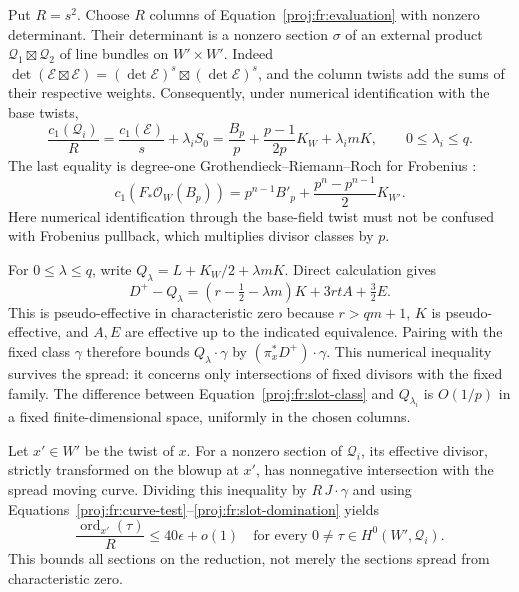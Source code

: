 \documentclass[11pt,letterpaper]{article}
\theoremstyle{definition}
\theoremstyle{remark}
\begin{document}
Put \(R=s^2\). Choose \(R\) columns of
Equation~\eqref{proj:fr:evaluation} with nonzero determinant. Their
determinant is a nonzero section \(\sigma\) of an external product
\(\mathcal Q_1\boxtimes\mathcal Q_2\) of line bundles on \(W'\times W'\).
Indeed
\(\det(\mathcal E\boxtimes\mathcal E)
 =(\det\mathcal E)^s\boxtimes(\det\mathcal E)^s\),
and the column twists add the sums of their respective weights.
Consequently, under numerical identification with the base twists,
\begin{equation}
\label{proj:fr:slot-class}
 \frac{c_1(\mathcal Q_i)}{R}
   =\frac{c_1(\mathcal E)}s+\lambda_iS_0
   =\frac{B_p}{p}+\frac{p-1}{2p}K_W+\lambda_i mK,
 \qquad 0\leq\lambda_i\leq q.
\end{equation}
The last equality is degree-one Grothendieck--Riemann--Roch for
Frobenius \cite[Lemma~4.2]{Proj-Sun2008}:
\[
 c_1(F_*\mathcal{O}_W(B_p))
   =p^{n-1}B'_p+\frac{p^n-p^{n-1}}2K_{W'}.
\]
Here numerical identification through the base-field twist must not
be confused with Frobenius pullback, which multiplies divisor classes
by \(p\).

For \(0\leq\lambda\leq q\), write
\(Q_\lambda=L+K_W/2+\lambda mK\). Direct calculation gives
\begin{equation}
\label{proj:fr:slot-domination}
 D^+-Q_\lambda
   =(r-\tfrac12-\lambda m)K+3rtA+\tfrac32E.
\end{equation}
This is pseudo-effective in characteristic zero because
\(r>qm+1\), \(K\) is pseudo-effective, and \(A,E\) are effective up
to the indicated equivalence. Pairing with the fixed class \(\gamma\)
therefore bounds \(Q_\lambda\cdot\gamma\) by
\((\pi_x^*D^+)\cdot\gamma\). This numerical inequality survives the
spread: it concerns only intersections of fixed divisors with the
fixed family. The difference between
Equation~\eqref{proj:fr:slot-class} and \(Q_{\lambda_i}\) is \(O(1/p)\)
in a fixed finite-dimensional space, uniformly in the chosen columns.

Let \(x'\in W'\) be the twist of \(x\). For a nonzero section of
\(\mathcal Q_i\), its effective divisor, strictly transformed on the
blowup at \(x'\), has nonnegative intersection with the spread moving
curve. Dividing this inequality by \(R\,J\cdot\gamma\) and using
Equations~\eqref{proj:fr:curve-test}--\eqref{proj:fr:slot-domination} yields
\begin{equation}
\label{proj:fr:slot-order}
 \frac{\operatorname{ord}_{x'}(\tau)}R\leq40\epsilon+o(1)
 \quad\text{for every }0\ne\tau\in H^0(W',\mathcal Q_i).
\end{equation}
This bounds all sections on the reduction, not merely the sections
spread from characteristic zero.
\end{document}
